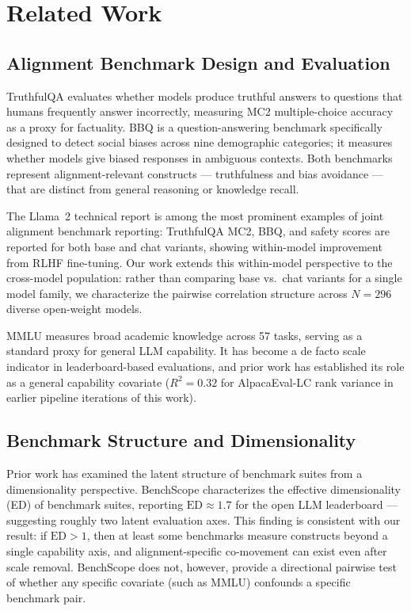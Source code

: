 \section{Related Work}
\label{sec:related}

\subsection{Alignment Benchmark Design and Evaluation}

TruthfulQA \citep{lin2022truthfulqa} evaluates whether models produce truthful answers to questions that humans frequently answer incorrectly, measuring MC2 multiple-choice accuracy as a proxy for factuality. BBQ \citep{parrish2022bbq} is a question-answering benchmark specifically designed to detect social biases across nine demographic categories; it measures whether models give biased responses in ambiguous contexts. Both benchmarks represent alignment-relevant constructs --- truthfulness and bias avoidance --- that are distinct from general reasoning or knowledge recall.

The Llama~2 technical report \citep{touvron2023llama2} is among the most prominent examples of joint alignment benchmark reporting: TruthfulQA MC2, BBQ, and safety scores are reported for both base and chat variants, showing within-model improvement from RLHF fine-tuning. Our work extends this within-model perspective to the cross-model population: rather than comparing base vs.\ chat variants for a single model family, we characterize the pairwise correlation structure across $N{=}296$ diverse open-weight models.

MMLU \citep{hendrycks2021mmlu} measures broad academic knowledge across 57 tasks, serving as a standard proxy for general LLM capability. It has become a de facto scale indicator in leaderboard-based evaluations, and prior work has established its role as a general capability covariate ($R^2 = 0.32$ for AlpacaEval-LC rank variance in earlier pipeline iterations of this work).

\subsection{Benchmark Structure and Dimensionality}

Prior work has examined the latent structure of benchmark suites from a dimensionality perspective. BenchScope \citep{sha2026benchscope} characterizes the effective dimensionality (ED) of benchmark suites, reporting $\text{ED} \approx 1.7$ for the open LLM leaderboard --- suggesting roughly two latent evaluation axes. This finding is consistent with our result: if $\text{ED} > 1$, then at least some benchmarks measure constructs beyond a single capability axis, and alignment-specific co-movement can exist even after scale removal. BenchScope does not, however, provide a directional pairwise test of whether any specific covariate (such as MMLU) confounds a specific benchmark pair.

